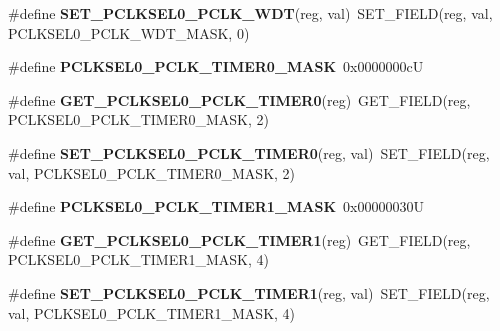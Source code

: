\begin{DoxyCompactItemize}
\#define {\bfseries S\+E\+T\+\_\+\+P\+C\+L\+K\+S\+E\+L0\+\_\+\+P\+C\+L\+K\+\_\+\+W\+DT}(reg,  val)~S\+E\+T\+\_\+\+F\+I\+E\+LD(reg, val, P\+C\+L\+K\+S\+E\+L0\+\_\+\+P\+C\+L\+K\+\_\+\+W\+D\+T\+\_\+\+M\+A\+SK, 0)
\item 
\mbox{\label{group__lpc24xx__regs_ga0aea086458547cfac2b106b683985400}} 
\#define {\bfseries P\+C\+L\+K\+S\+E\+L0\+\_\+\+P\+C\+L\+K\+\_\+\+T\+I\+M\+E\+R0\+\_\+\+M\+A\+SK}~0x0000000cU
\item 
\mbox{\label{group__lpc24xx__regs_gac644fe746b55c8b148fe962369d3cf23}} 
\#define {\bfseries G\+E\+T\+\_\+\+P\+C\+L\+K\+S\+E\+L0\+\_\+\+P\+C\+L\+K\+\_\+\+T\+I\+M\+E\+R0}(reg)~G\+E\+T\+\_\+\+F\+I\+E\+LD(reg, P\+C\+L\+K\+S\+E\+L0\+\_\+\+P\+C\+L\+K\+\_\+\+T\+I\+M\+E\+R0\+\_\+\+M\+A\+SK, 2)
\item 
\mbox{\label{group__lpc24xx__regs_gadc2dd32487ca31a9ab8fc66b43b439f9}} 
\#define {\bfseries S\+E\+T\+\_\+\+P\+C\+L\+K\+S\+E\+L0\+\_\+\+P\+C\+L\+K\+\_\+\+T\+I\+M\+E\+R0}(reg,  val)~S\+E\+T\+\_\+\+F\+I\+E\+LD(reg, val, P\+C\+L\+K\+S\+E\+L0\+\_\+\+P\+C\+L\+K\+\_\+\+T\+I\+M\+E\+R0\+\_\+\+M\+A\+SK, 2)
\item 
\mbox{\label{group__lpc24xx__regs_ga28232b9d72074e63a352fedd22dbbe9b}} 
\#define {\bfseries P\+C\+L\+K\+S\+E\+L0\+\_\+\+P\+C\+L\+K\+\_\+\+T\+I\+M\+E\+R1\+\_\+\+M\+A\+SK}~0x00000030U
\item 
\mbox{\label{group__lpc24xx__regs_ga887e96b011fcf328a6d1ab7631d0c79f}} 
\#define {\bfseries G\+E\+T\+\_\+\+P\+C\+L\+K\+S\+E\+L0\+\_\+\+P\+C\+L\+K\+\_\+\+T\+I\+M\+E\+R1}(reg)~G\+E\+T\+\_\+\+F\+I\+E\+LD(reg, P\+C\+L\+K\+S\+E\+L0\+\_\+\+P\+C\+L\+K\+\_\+\+T\+I\+M\+E\+R1\+\_\+\+M\+A\+SK, 4)
\item 
\mbox{\label{group__lpc24xx__regs_ga3638b6b6344c2dcd37cd38c33adada89}} 
\#define {\bfseries S\+E\+T\+\_\+\+P\+C\+L\+K\+S\+E\+L0\+\_\+\+P\+C\+L\+K\+\_\+\+T\+I\+M\+E\+R1}(reg,  val)~S\+E\+T\+\_\+\+F\+I\+E\+LD(reg, val, P\+C\+L\+K\+S\+E\+L0\+\_\+\+P\+C\+L\+K\+\_\+\+T\+I\+M\+E\+R1\+\_\+\+M\+A\+SK, 4)
\item 
\mbox{\label{group__lpc24xx__regs_ga4558f70ba193e6db7dffdc291156635a}} 

\end{DoxyCompactItemize}
